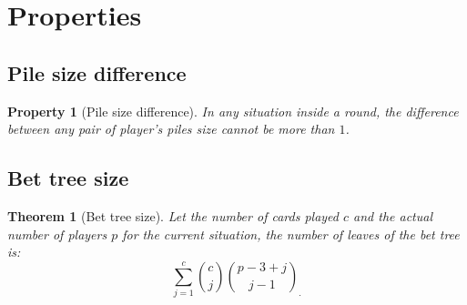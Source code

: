 \documentclass[conference]{IEEEtran}
\newtheorem{thm}{Theorem}
\newtheorem{pry}{Property}
\begin{document}
\section{Properties}

\subsection{Pile size difference}

\begin{pry}[Pile size difference]
In any situation inside a round, the difference between any pair of player's piles size cannot be more than $1$.
\end{pry}

\subsection{Bet tree size}

\begin{thm}[Bet tree size]
Let the number of cards played $c$ and the actual number of players $p$ for the current situation, the number of leaves of the bet tree is:
\[ 
\sum^c_{j=1} \binom{c}{j} \binom{p-3+j}{j-1}_{.}
\]
\end{thm}





% 
% 
% 


%
\end{document}
